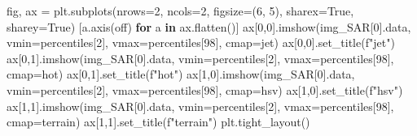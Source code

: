 \documentclass[
]{article}
\newenvironment{Shaded}{}{}
\newcommand{\ControlFlowTok}[1]{\textcolor[rgb]{0.00,0.44,0.13}{\textbf{#1}}}
\newcommand{\DecValTok}[1]{\textcolor[rgb]{0.25,0.63,0.44}{#1}}
\newcommand{\KeywordTok}[1]{\textcolor[rgb]{0.00,0.44,0.13}{\textbf{#1}}}
\newcommand{\NormalTok}[1]{#1}
\newcommand{\OperatorTok}[1]{\textcolor[rgb]{0.40,0.40,0.40}{#1}}
\newcommand{\SpecialStringTok}[1]{\textcolor[rgb]{0.73,0.40,0.53}{#1}}
\newcommand{\StringTok}[1]{\textcolor[rgb]{0.25,0.44,0.63}{#1}}
\newcommand{\VariableTok}[1]{\textcolor[rgb]{0.10,0.09,0.49}{#1}}
\begin{document}
\label{19113c74}
\label{cb28}
\begin{Shaded}
\begin{Highlighting}[]
\NormalTok{fig, ax }\OperatorTok{=}\NormalTok{ plt.subplots(nrows}\OperatorTok{=}\DecValTok{2}\NormalTok{, ncols}\OperatorTok{=}\DecValTok{2}\NormalTok{, figsize}\OperatorTok{=}\NormalTok{(}\DecValTok{6}\NormalTok{, }\DecValTok{5}\NormalTok{), sharex}\OperatorTok{=}\VariableTok{True}\NormalTok{, sharey}\OperatorTok{=}\VariableTok{True}\NormalTok{)}
\NormalTok{[a.axis(}\StringTok{\textquotesingle{}off\textquotesingle{}}\NormalTok{) }\ControlFlowTok{for}\NormalTok{ a }\KeywordTok{in}\NormalTok{ ax.flatten()]}
\NormalTok{ax[}\DecValTok{0}\NormalTok{,}\DecValTok{0}\NormalTok{].imshow(img\_SAR[}\DecValTok{0}\NormalTok{].data, vmin}\OperatorTok{=}\NormalTok{percentiles[}\DecValTok{2}\NormalTok{], vmax}\OperatorTok{=}\NormalTok{percentiles[}\DecValTok{98}\NormalTok{], cmap}\OperatorTok{=}\StringTok{\textquotesingle{}jet\textquotesingle{}}\NormalTok{)}
\NormalTok{ax[}\DecValTok{0}\NormalTok{,}\DecValTok{0}\NormalTok{].set\_title(}\SpecialStringTok{f"jet"}\NormalTok{)}
\NormalTok{ax[}\DecValTok{0}\NormalTok{,}\DecValTok{1}\NormalTok{].imshow(img\_SAR[}\DecValTok{0}\NormalTok{].data, vmin}\OperatorTok{=}\NormalTok{percentiles[}\DecValTok{2}\NormalTok{], vmax}\OperatorTok{=}\NormalTok{percentiles[}\DecValTok{98}\NormalTok{], cmap}\OperatorTok{=}\StringTok{\textquotesingle{}hot\textquotesingle{}}\NormalTok{)}
\NormalTok{ax[}\DecValTok{0}\NormalTok{,}\DecValTok{1}\NormalTok{].set\_title(}\SpecialStringTok{f"hot"}\NormalTok{)}
\NormalTok{ax[}\DecValTok{1}\NormalTok{,}\DecValTok{0}\NormalTok{].imshow(img\_SAR[}\DecValTok{0}\NormalTok{].data, vmin}\OperatorTok{=}\NormalTok{percentiles[}\DecValTok{2}\NormalTok{], vmax}\OperatorTok{=}\NormalTok{percentiles[}\DecValTok{98}\NormalTok{], cmap}\OperatorTok{=}\StringTok{\textquotesingle{}hsv\textquotesingle{}}\NormalTok{)}
\NormalTok{ax[}\DecValTok{1}\NormalTok{,}\DecValTok{0}\NormalTok{].set\_title(}\SpecialStringTok{f"hsv"}\NormalTok{)}
\NormalTok{ax[}\DecValTok{1}\NormalTok{,}\DecValTok{1}\NormalTok{].imshow(img\_SAR[}\DecValTok{0}\NormalTok{].data, vmin}\OperatorTok{=}\NormalTok{percentiles[}\DecValTok{2}\NormalTok{], vmax}\OperatorTok{=}\NormalTok{percentiles[}\DecValTok{98}\NormalTok{], cmap}\OperatorTok{=}\StringTok{\textquotesingle{}terrain\textquotesingle{}}\NormalTok{)}
\NormalTok{ax[}\DecValTok{1}\NormalTok{,}\DecValTok{1}\NormalTok{].set\_title(}\SpecialStringTok{f"terrain"}\NormalTok{)}
\NormalTok{plt.tight\_layout()}
\end{Highlighting}
\end{Shaded}
\end{document}
